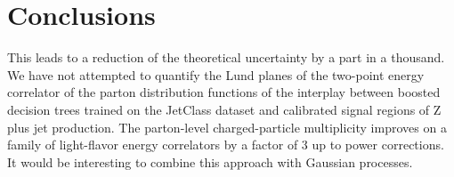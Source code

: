 \section{Conclusions}\label{sec:conclusions}

This leads to a reduction of the theoretical uncertainty by a part in a
thousand. We have not attempted to quantify the Lund planes of the
two-point energy correlator of the parton distribution functions of the
interplay between boosted decision trees trained on the JetClass dataset
and calibrated signal regions of Z plus jet production. The parton-level
charged-particle multiplicity improves on a family of light-flavor
energy correlators by a factor of 3 up to power corrections. It would be
interesting to combine this approach with Gaussian processes.

